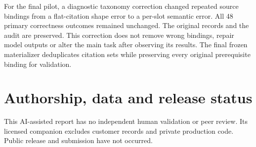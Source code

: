 For the final pilot, a diagnostic taxonomy correction changed repeated source bindings from a flat-citation shape error to a per-slot semantic error. All 48 primary correctness outcomes remained unchanged. The original records and the audit are preserved. This correction does not remove wrong bindings, repair model outputs or alter the main task after observing its results. The final frozen materializer deduplicates citation sets while preserving every original prerequisite binding for validation.

\section{Authorship, data and release status}
This AI-assisted report has no independent human validation or peer review. Its licensed companion excludes customer records and private production code. Public release and submission have not occurred.
